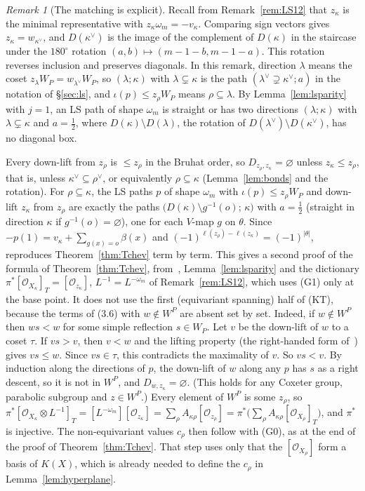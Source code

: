 \documentclass[11pt]{amsart}
\theoremstyle{definition}
\theoremstyle{remark}
\newtheorem{remark}[theorem]{Remark}
\newcommand{\cO}{\mathcal{O}}
\begin{document}
\begin{remark}[The matching is explicit]\label{rem:LSbij}
Recall from Remark~\ref{rem:LS12} that $z_\kappa$ is the minimal representative with $z_\kappa\omega_m=-v_\kappa$. Comparing sign vectors gives
$z_\kappa=w_{\kappa^\vee}$, and $D(\kappa^\vee)$ is the image of the complement of $D(\kappa)$ in the staircase under
the $180^\circ$ rotation $(a,b)\mapsto(m-1-b,m-1-a)$. This rotation reverses inclusion and preserves diagonals. In this
remark, direction $\lambda$ means the coset $z_\lambda W_P=w_{\lambda^\vee}W_P$, so $(\lambda;\kappa)$ with $\lambda\subsetneq\kappa$
is the path $(\lambda^\vee\supsetneq\kappa^\vee;a)$ in the notation of \S\ref{sec:ls}, and $\iota(p)\le z_\rho W_P$
means $\rho\subseteq\lambda$. By Lemma~\ref{lem:lsparity} with $j=1$, an LS path of shape $\omega_m$ is straight or
has two directions $(\lambda;\kappa)$ with $\lambda\subsetneq\kappa$ and $a=\tfrac12$, where $D(\kappa)\setminus D(\lambda)$, the
rotation of $D(\lambda^\vee)\setminus D(\kappa^\vee)$, has no diagonal box.

Every down-lift from $z_\rho$ is $\le z_\rho$ in the Bruhat order, so $D_{z_\rho,z_\kappa}=\varnothing$ unless
$z_\kappa\le z_\rho$, that is, unless $\kappa^\vee\subseteq\rho^\vee$, or equivalently $\rho\subseteq\kappa$
(Lemma~\ref{lem:bonds} and the rotation). For $\rho\subseteq\kappa$, the LS paths $p$ of shape $\omega_m$ with
$\iota(p)\le z_\rho W_P$ and down-lift $z_\kappa$ from $z_\rho$ are
exactly the paths $\bigl(D(\kappa)\setminus g^{-1}(o);\,\kappa\bigr)$ with $a=\tfrac12$ (straight in direction $\kappa$ if
$g^{-1}(o)=\varnothing$), one for each $V$-map $g$ on $\theta$. Since $-p(1)=v_\kappa+\sum_{g(x)=o}\beta(x)$ and
$(-1)^{\ell(z_\rho)-\ell(z_\kappa)}=(-1)^{|\theta|}$, \cite[Cor.~3.4, (3.6)]{LS12} reproduces
Theorem~\ref{thm:Tchev} term by term. This gives a second proof of the formula of Theorem~\ref{thm:Tchev}, from~\cite{LS12},
Lemma~\ref{lem:lsparity} and the dictionary $\pi^*[\cO_{X_\kappa}]_T=[\cO_{z_\kappa}]$, $L^{-1}=L^{-\omega_m}$ of
Remark~\ref{rem:LS12}, which uses (G1) only at the base point. It does not use the first (equivariant spanning) half of (KT), because the terms of (3.6) with
$w\notin W^P$ are absent set by set. Indeed, if $w\notin W^P$ then $ws<w$ for some simple reflection $s\in W_P$. Let
$v$ be the down-lift of $w$ to a coset $\tau$. If $vs>v$, then $v<w$ and the lifting property (the right-handed form
of~\cite[Prop.~2.2.7]{BB05}) gives $vs\le w$. Since $vs\in\tau$, this contradicts the maximality of $v$. So $vs<v$.
By induction along the directions of $p$, the down-lift of $w$ along any $p$ has $s$ as a right descent, so it is not
in $W^P$, and $D_{w,z_\kappa}=\varnothing$. (This holds for any Coxeter group, parabolic subgroup and $z\in W^P$.)
Every element of $W^P$ is some $z_\rho$, so
$\pi^*[\cO_{X_\kappa}\otimes L^{-1}]_T=[L^{-\omega_m}][\cO_{z_\kappa}]=\sum_\rho A_{\kappa\rho}[\cO_{z_\rho}]
=\pi^*\bigl(\sum_\rho A_{\kappa\rho}[\cO_{X_\rho}]_T\bigr)$, and $\pi^*$ is injective.
The non-equivariant values $c_\rho$ then follow with (G0), as at the end of the proof of Theorem~\ref{thm:Tchev}. That step
uses only that the $[\cO_{X_\rho}]$ form a basis of $K(X)$, which is already needed to define the $c_\rho$ in
Lemma~\ref{lem:hyperplane}.


\end{remark}
\end{document}
